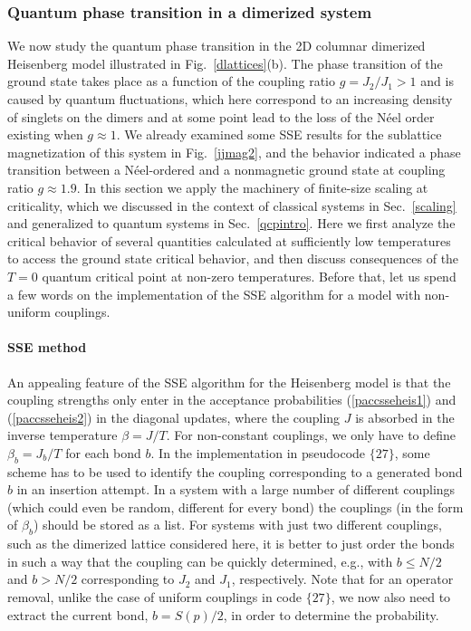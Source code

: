 \documentclass[draft,numberedheadings]{aipproc}
\begin{document}
\subsubsection{Quantum phase transition in a dimerized system}
\label{sec_dimerized}

We now study the quantum phase transition in the 2D columnar dimerized Heisenberg model illustrated in Fig.~\ref{dlattices}(b). The phase transition 
of the ground state takes place as a function of the coupling ratio $g=J_2/J_1>1$ and is caused by quantum fluctuations, which here correspond to an
increasing density of singlets on the dimers and at some point lead to the loss of the N\'eel order existing when $g\approx 1$. We already examined some 
SSE results for the sublattice magnetization of this system in Fig.~\ref{jjmag2}, and the behavior indicated a phase transition between a N\'eel-ordered 
and a nonmagnetic ground state at coupling ratio $g\approx 1.9$. In this section we apply the machinery of finite-size scaling at criticality, which we 
discussed in the context of classical systems in Sec.~\ref{scaling} and generalized to quantum systems in Sec.~\ref{qcpintro}. Here we first analyze the 
critical behavior of several quantities calculated at sufficiently low temperatures to access the ground state critical behavior, and then discuss 
consequences of the $T=0$ quantum critical point at non-zero temperatures. Before that, let us spend a few words on the implementation of the SSE algorithm 
for a model with non-uniform couplings.

\paragraph{SSE method}

An appealing feature of the SSE algorithm for the Heisenberg model is that the coupling strengths only enter in the acceptance probabilities
(\ref{paccsseheis1}) and (\ref{paccsseheis2}) in the diagonal updates, where the coupling $J$ is absorbed in the inverse temperature $\beta=J/T$. 
For non-constant couplings, we only have to define $\beta_b=J_b/T$ for each bond $b$. In the implementation in pseudocode $\{27\}$, some scheme has 
to be used to identify the coupling corresponding to a generated bond $b$ in an insertion attempt. In a system with a large number of different 
couplings (which could even be random, different for every bond) the couplings (in the form of $\beta_b$) should be stored as a list. For systems 
with just two different couplings, such as the dimerized lattice considered here, it is better to just order the bonds in such a way that the coupling 
can be quickly determined, e.g., with $b\le N/2$ and $b> N/2$ corresponding to $J_2$ and $J_1$, respectively. Note that for an operator removal, 
unlike the case of uniform couplings in code $\{27\}$, we now also need to extract the current bond, $b=S(p)/2$, in order to determine the 
probability.
\end{document}
